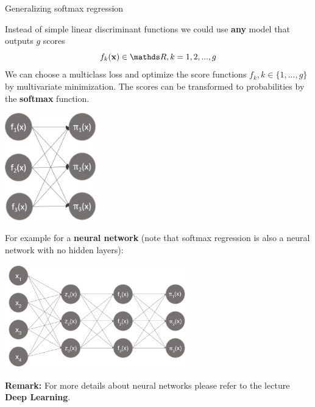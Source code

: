 \documentclass[11pt,compress,t,notes=noshow, xcolor=table]{beamer}
\begin{document}
\begin{vbframe}{Generalizing softmax regression} 

Instead of simple linear discriminant functions we could use \textbf{any} model that outputs $g$ scores 
$$
  f_k(\xv) \in \R, k = 1, 2, ..., g
$$
We can choose a multiclass loss and optimize the score functions $f_k, k \in \{1, ..., g\}$ by multivariate minimization. 
The scores can be transformed to probabilities by the \textbf{softmax} function.

\begin{center}
  \includegraphics[width=0.3\textwidth]{figure_man/score_model.png}
\end{center}

\framebreak 

For example for a \textbf{neural network} (note that softmax regression is also a neural network with no hidden layers):

\begin{center}
  \includegraphics[width=0.6\textwidth]{figure_man/neural_net.png}
\end{center}

\textbf{Remark:} For more details about neural networks please refer to the lecture \textbf{Deep Learning}. 


\end{vbframe}


\endlecture
\end{document}
